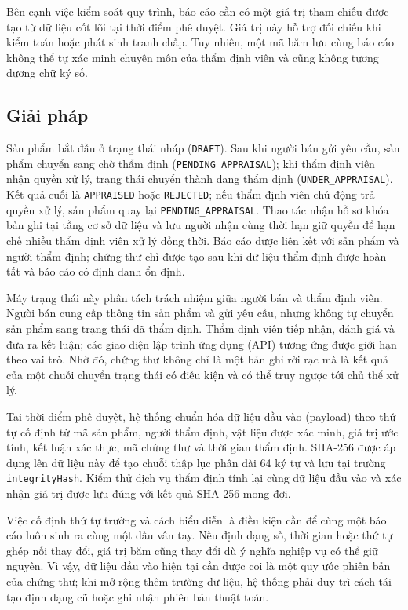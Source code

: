 \documentclass[../DoAn.tex]{subfiles}
\begin{document}
Bên cạnh việc kiểm soát quy trình, báo cáo cần có một giá trị tham chiếu được tạo từ dữ liệu cốt lõi tại thời điểm phê duyệt. Giá trị này hỗ trợ đối chiếu khi kiểm toán hoặc phát sinh tranh chấp. Tuy nhiên, một mã băm lưu cùng báo cáo không thể tự xác minh chuyên môn của thẩm định viên và cũng không tương đương chữ ký số.

\subsection{Giải pháp}

Sản phẩm bắt đầu ở trạng thái nháp (\texttt{DRAFT}). Sau khi người bán gửi yêu cầu, sản phẩm chuyển sang chờ thẩm định (\texttt{PENDING\_APPRAISAL}); khi thẩm định viên nhận quyền xử lý, trạng thái chuyển thành đang thẩm định (\texttt{UNDER\_APPRAISAL}). Kết quả cuối là \texttt{APPRAISED} hoặc \texttt{REJECTED}; nếu thẩm định viên chủ động trả quyền xử lý, sản phẩm quay lại \texttt{PENDING\_APPRAISAL}. Thao tác nhận hồ sơ khóa bản ghi tại tầng cơ sở dữ liệu và lưu người nhận cùng thời hạn giữ quyền để hạn chế nhiều thẩm định viên xử lý đồng thời. Báo cáo được liên kết với sản phẩm và người thẩm định; chứng thư chỉ được tạo sau khi dữ liệu thẩm định được hoàn tất và báo cáo có định danh ổn định.

Máy trạng thái này phân tách trách nhiệm giữa người bán và thẩm định viên. Người bán cung cấp thông tin sản phẩm và gửi yêu cầu, nhưng không tự chuyển sản phẩm sang trạng thái đã thẩm định. Thẩm định viên tiếp nhận, đánh giá và đưa ra kết luận; các giao diện lập trình ứng dụng (API) tương ứng được giới hạn theo vai trò. Nhờ đó, chứng thư không chỉ là một bản ghi rời rạc mà là kết quả của một chuỗi chuyển trạng thái có điều kiện và có thể truy ngược tới chủ thể xử lý.

Tại thời điểm phê duyệt, hệ thống chuẩn hóa dữ liệu đầu vào (payload) theo thứ tự cố định từ mã sản phẩm, người thẩm định, vật liệu được xác minh, giá trị ước tính, kết luận xác thực, mã chứng thư và thời gian thẩm định. SHA-256 được áp dụng lên dữ liệu này để tạo chuỗi thập lục phân dài 64 ký tự và lưu tại trường \texttt{integrityHash}. Kiểm thử dịch vụ thẩm định tính lại cùng dữ liệu đầu vào và xác nhận giá trị được lưu đúng với kết quả SHA-256 mong đợi.

Việc cố định thứ tự trường và cách biểu diễn là điều kiện cần để cùng một báo cáo luôn sinh ra cùng một dấu vân tay. Nếu định dạng số, thời gian hoặc thứ tự ghép nối thay đổi, giá trị băm cũng thay đổi dù ý nghĩa nghiệp vụ có thể giữ nguyên. Vì vậy, dữ liệu đầu vào hiện tại cần được coi là một quy ước phiên bản của chứng thư; khi mở rộng thêm trường dữ liệu, hệ thống phải duy trì cách tái tạo định dạng cũ hoặc ghi nhận phiên bản thuật toán.
\end{document}

